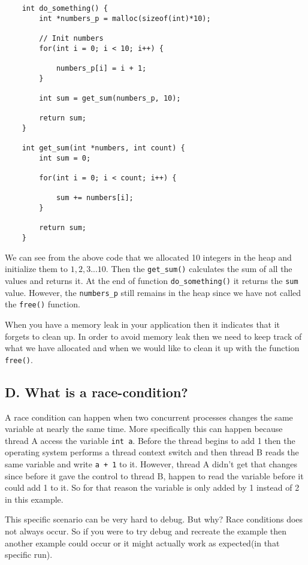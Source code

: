 \documentclass[11pt]{article}
\newcommand{\code}[1]{{\colorbox{lightgray!15}{\color{black}\texttt{#1}}}}
\begin{document}
\begin{lstlisting}
    int do_something() {
        int *numbers_p = malloc(sizeof(int)*10);

        // Init numbers
        for(int i = 0; i < 10; i++) {

            numbers_p[i] = i + 1;
        }

        int sum = get_sum(numbers_p, 10);
        
        return sum;
    }

    int get_sum(int *numbers, int count) {
        int sum = 0;

        for(int i = 0; i < count; i++) {

            sum += numbers[i];
        }

        return sum;
    }
\end{lstlisting}
We can see from the above code that we allocated 10 integers in the heap and initialize them 
to $1, 2, 3 ... 10$. Then the \code{get\_sum()} calculates the sum of all the values and returns it.
At the end of function \code{do\_something()} it returns the \code{sum} value. However, the \code{numbers\_p}
still remains in the heap since we have not called the \code{free()} function.

When you have a memory leak in your application then it indicates that it forgets to clean up.
In order to avoid memory leak then we need to keep track of what we have allocated and when we would like to clean it up with the function \code{free()}.

\subsection{D. What is a race-condition?}
A race condition can happen when two concurrent processes changes the same variable at nearly the same time. 
More specifically this can happen because thread A access the variable \code{int a}. Before the thread begins to add 1 then the operating system performs a thread context switch and then thread B reads the same variable and write \code{a + 1} to it.
However, thread A didn't get that changes since before it gave the control to thread B, happen to read the variable before it could add 1 to it. So for that reason the variable is only added by 1 instead of 2 in this example.

This specific scenario can be very hard to debug. But why? Race conditions does not always occur. So if you were to try debug and recreate the example then another example could occur or it might actually work as expected(in that specific run).
\end{document}
